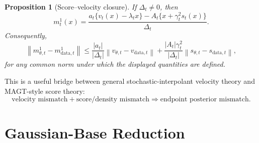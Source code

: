 \documentclass[11pt]{article}
\newcommand{\norm}[1]{\left\lVert #1 \right\rVert}
\newcommand{\data}{\mathrm{data}}
\theoremstyle{plain}
\newtheorem{proposition}{Proposition}
\theoremstyle{definition}
\begin{document}
\begin{proposition}[Score--velocity closure]
If \(\Delta_t\neq0\), then
\begin{equation}
m_t^1(x)
=
\frac{
a_t\{v_t(x)-\lambda_t x\}
-A_t\{x+\gamma_t^2s_t(x)\}
}{
\Delta_t
}.
\end{equation}
Consequently,
\begin{equation}
\norm{m_{\theta,t}^1-m_{\data,t}^1}
\le
\frac{|a_t|}{|\Delta_t|}
\norm{v_{\theta,t}-v_{\data,t}}
+
\frac{|A_t|\gamma_t^2}{|\Delta_t|}
\norm{s_{\theta,t}-s_{\data,t}},
\end{equation}
for any common norm under which the displayed quantities are defined.
\end{proposition}

This is a useful bridge between general stochastic-interpolant velocity theory
and MAGT-style score theory:
\begin{equation}
\text{velocity mismatch}
+
\text{score/density mismatch}
\Longrightarrow
\text{endpoint posterior mismatch}.
\end{equation}

\section{Gaussian-Base Reduction}
\end{document}
